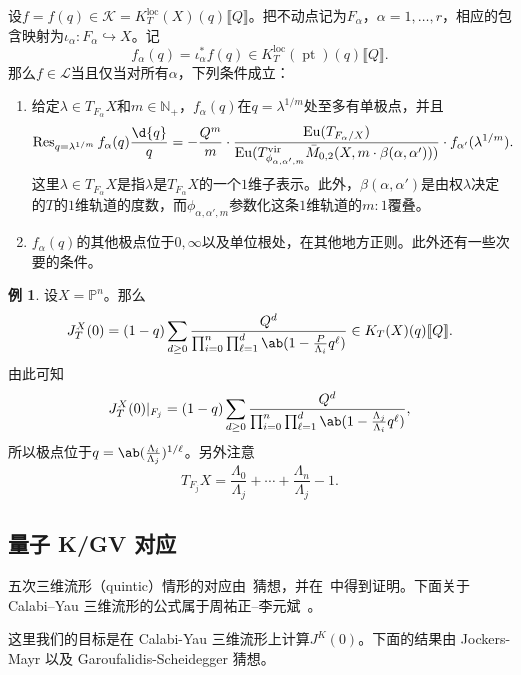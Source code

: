 \documentclass{amsart}
\theoremstyle{definition}
\newtheorem{exm}[thm]{例}
\theoremstyle{remark}
\theoremstyle{plain}
\theoremstyle{definition}
\theoremstyle{remark}
\newcommand{\N}{\mathbb{N}}
\renewcommand{\P}{\mathbb{P}}
\newcommand{\mc}[1]{\mathcal{#1}}
\newcommand{\mr}[1]{\mathrm{#1}}
\newcommand{\on}[1]{\operatorname{#1}}
\newcommand{\1}{\mathbf{1}}
\newcommand{\2}{\mathbf{2}}
\newcommand{\3}{\mathbf{3}}
\newcommand{\vir}{\mr{vir}}
\newcommand{\ps}[1]{\llbracket #1 \rrbracket}
\newcommand{\loc}{\mr{loc}}
\begin{document}
设\(f = f(q) \in \mc{K} = K_T^{\loc}(X)(q)\ps{Q}\)。把不动点记为\(F_{\alpha}\)，\(\alpha = 1, \ldots, r\)，相应的包含映射为\(\iota_{\alpha} \colon F_{\alpha} \hookrightarrow X\)。记
\[ f_{\alpha}(q) = \iota_{\alpha}^* f(q) \in K_T^{\loc}(\on{pt})(q)\ps{Q}. \]
那么\(f \in \mc{L}\)当且仅当对所有\(\alpha\)，下列条件成立：
\begin{enumerate}
    \item 给定\(\lambda \in T_{F_{\alpha}} X\)和\(m \in \N_+\)，\(f_{\alpha}(q)\)在\(q = \lambda^{1/m}\)处至多有单极点，并且
        \[ \on{Res}_{q = \lambda^{1/m}} f_{\alpha}(q) \frac{\d{q}}{q} = -\frac{Q^m}{m} \cdot \frac{\on{Eu}(T_{F_{\alpha}/X})}{\on{Eu}(T^{\vir}_{\phi_{\alpha,\alpha',m}}\bar{M}_{0,2}(X, m \cdot \beta(\alpha, \alpha')))} \cdot f_{\alpha'}(\lambda^{1/m}). \]
        这里\(\lambda \in T_{F_{\alpha}}X\)是指\(\lambda\)是\(T_{F_{\alpha}} X\)的一个\(1\)维子表示。此外，\(\beta(\alpha,\alpha')\)是由权\(\lambda\)决定的\(T\)的\(1\)维轨道的度数，而\(\phi_{\alpha, \alpha', m}\)参数化这条\(1\)维轨道的\(m:1\)覆叠。
    \item \(f_{\alpha}(q)\)的其他极点位于\(0, \infty\)以及单位根处，在其他地方正则。此外还有一些次要的条件。
\end{enumerate}

\begin{exm}
    设\(X = \P^n\)。那么
    \[ J_T^X(0) = (1-q) \sum_{d \geq 0} \frac{Q^d}{\prod_{i=0}^n \prod_{\ell = 1}^d \ab(1 - \frac{P}{\Lambda_i} q^{\ell})} \in K_T(X)(q) \ps{Q}. \]
    由此可知
    \[ J_T^X(0) |_{F_j} = (1-q) \sum_{d \geq 0} \frac{Q^d}{\prod_{i=0}^n \prod_{\ell = 1}^d \ab(1 - \frac{\Lambda_j}{\Lambda_i}q^{\ell})}, \]
    所以极点位于\(q = \ab(\frac{\Lambda_i}{\Lambda_j})^{1/\ell}\)。另外注意
    \[ T_{F_j} X = \frac{\Lambda_0}{\Lambda_j} + \cdots + \frac{\Lambda_n}{\Lambda_j} - 1. \]
\end{exm}

\subsection{量子 K/GV 对应}%
\label{sub:Quantum K/GV correspondence}

五次三维流形（quintic）情形的对应由~\cite{GaroufalidisScheidegger2022}猜想，并在~\cite{ChouLeeQuintic}中得到证明。下面关于 Calabi--Yau 三维流形的公式属于周祐正--李元斌~\cite{ChouLee2025}。

这里我们的目标是在 Calabi-Yau 三维流形上计算\(J^K(0)\)。下面的结果由 Jockers-Mayr 以及 Garoufalidis-Scheidegger 猜想。
\end{document}
